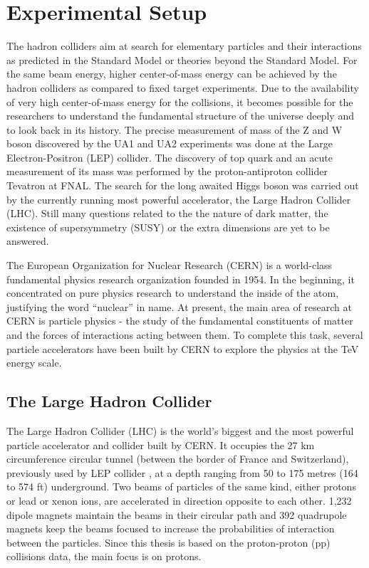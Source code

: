 \chapter{Experimental Setup}
\label{chap:Detector}
The hadron colliders aim at search for elementary particles and their interactions as predicted in the Standard Model or theories beyond the Standard Model. For the same beam energy, higher center-of-mass energy can be achieved by the hadron colliders as compared to fixed target experiments. Due to the availability of very high center-of-mass energy for the collisions, it becomes possible for the researchers to understand the fundamental structure of the universe deeply and to look back in its history. The precise measurement of mass of the Z and W boson discovered by the UA1 and UA2 experiments was done at the Large Electron-Positron (LEP) collider. The discovery of top quark and an acute measurement of its mass was performed by the proton-antiproton collider Tevatron at FNAL. The search for the long awaited Higgs boson was carried out by the currently running most powerful accelerator, the Large Hadron Collider (LHC). Still many questions related to the the nature of dark matter, the existence of supersymmetry (SUSY) or the extra dimensions are yet to be answered. 

The European Organization for Nuclear Research (CERN) is a world-class fundamental physics research organization founded in 1954. In the beginning, it concentrated on pure physics research to understand the inside of the atom, justifying the word ``nuclear'' in name. At present, the main area of research at CERN is particle physics - the study of the fundamental constituents of matter and the forces of interactions acting between them. To complete this task, several particle accelerators have been built by CERN to explore the physics at the TeV energy scale.

\section{The Large Hadron Collider}
The Large Hadron Collider (LHC) \cite{Evans:2008zzb} is the world's biggest and the most powerful particle accelerator and collider built by CERN. It occupies the 27 km circumference circular tunnel (between the border of France and Switzerland), previously used by LEP collider \cite{LEP}, at a depth ranging from 50 to 175 metres (164 to 574 ft) underground. Two beams of particles of the same kind, either protons or lead or xenon ions, are accelerated in direction opposite to each other. 1,232 dipole magnets maintain the beams in their circular path and 392 quadrupole magnets keep the beams focused to increase the probabilities of interaction between the particles. Since this thesis is based on the proton-proton (pp) collisions data, the main focus is on protons. 

